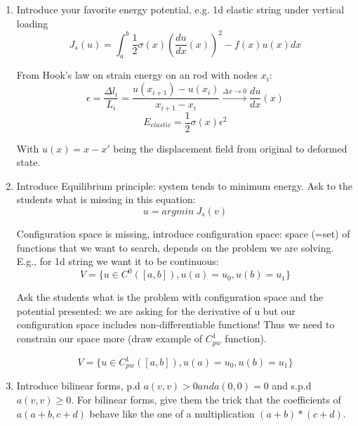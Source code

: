 \begin{enumerate}
    \item 
Introduce your favorite energy potential, e.g. 1d elastic string under vertical loading
\begin{equation}
    J_s(u) = \int_a^b \frac{1}{2}\sigma(x) (\frac{du}{dx}(x))^2 - f(x)u(x) dx
\end{equation}

From Hook's law on strain energy on an rod with nodes $x_i$:
\begin{equation}
    \epsilon = \frac{\Delta l_i}{L_i} = \frac{u(x_{i+1}) - u(x_i)}{x_{i+1} - x_i} \xrightarrow{\Delta x \rightarrow 0} \frac{du}{dx}(x)
\end{equation}
\begin{equation}
    E_{elastic} = \frac{1}{2}\sigma(x)\epsilon^2
\end{equation}

With $u(x) = x - x'$ being the displacement field from original to deformed state.

\item
Introduce Equilibrium principle: system tends to minimum energy. Ask to the students what is missing in this equation:
\begin{equation}
    u = argmin \ J_s(v)
\end{equation}

Configuration space is missing, introduce configuration space: space (=set) of functions that we want to search, depends on the problem we are solving. E.g., for 1d string we want it to be continuous:
\begin{equation}
    V = \{u \in C^0([a, b]), u(a) = u_0, u(b) = u_1\}
\end{equation}

Ask the students what is the problem with configuration space and the potential presented: we are asking for the derivative of u but our configuration space includes non-differentiable functions!
Thus we need to constrain our space more (draw example of $C^1_{pw}$ function).

\begin{equation}
    V = \{u \in C^1_{pw}([a,b]), u(a) = u_0, u(b) = u_1\}
\end{equation}

\item Introduce bilinear forms, p.d $a(v,v) > 0 and a(0, 0) = 0$ and s.p.d $a(v,v) \geq 0$. For bilinear forms, give them the trick that the coefficients of $a(a+b, c+d)$ behave like the one of a multiplication $(a+b)*(c+d)$.

\end{enumerate}



